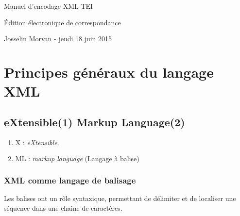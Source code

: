 \documentclass[18pt,a4paper,oneside]{book} %
\begin{document}
	\begin{center}
	
		\begin{Huge}
			Manuel d'encodage XML-TEI
		\end{Huge}

	\bigskip 

		\begin{huge}
			Édition électronique de correspondance
		\end{huge}

	\bigskip 
		\begin{normalsize}
			\bigskip 
			Josselin Morvan - jeudi 18 juin 2015
		\end{normalsize}
	\end{center}


\part{Principes généraux du langage XML}

\chapter{eXtensible(1) Markup Language(2)}

\begin{enumerate}
\item X : \textit{eXtensible}.
\item ML : \textit{markup language} (Langage à balise)
\end{enumerate}


\section{XML comme langage de balisage}
\bigskip 
Les balises ont un rôle syntaxique, permettant de délimiter et de localiser une séquence dans une chaine de caractères.
\bigskip 
\end{document}

